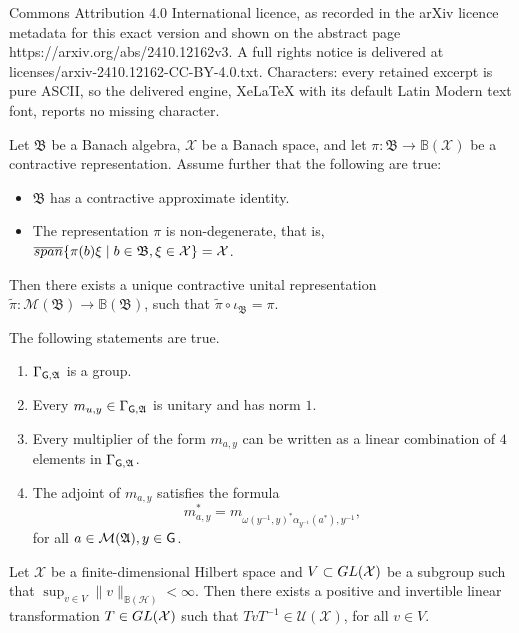 \documentclass[10pt,a4paper]{amsart}
\def\BofH{\mathbb B(\mathcal H)}
\def\G{{\sf G}}
\def\X{\mathcal{X}}
\newcommand{\A}{\mathfrak{A}}
\newcommand{\B}{\mathfrak{B}}
\providecommand{\norm}[1]{\lVert#1\rVert}
\begin{document}
Commons Attribution 4.0 International licence, as recorded in the arXiv licence metadata for this exact version and shown on the abstract page https://arxiv.org/abs/2410.12162v3. A full rights notice is delivered at licenses/arxiv-2410.12162-CC-BY-4.0.txt. Characters: every retained excerpt is pure ASCII, so the delivered engine, XeLaTeX with its default Latin Modern text font, reports no missing character.
\begin{lem}\label{exten}
Let $\B$ be a Banach algebra, $\X$ be a Banach space, and let $\pi:\B\to \mathbb B(\X)$ be a contractive representation. Assume further that the following are true: \begin{itemize}
\item[(i)] $\B$ has a contractive approximate identity.
\item[(ii)] The representation $\pi$ is non-degenerate, that is, $\overline{\rm span}\{\pi(b)\xi\mid b\in\B, \xi\in \X\}=\X$.
\end{itemize}
Then there exists a unique contractive unital representation $\widetilde\pi: \mathcal M(\B)\to \mathbb B(\B)$, such that $\widetilde\pi\circ\iota_\B=\pi$.
\end{lem}

\begin{lem}\label{easy} The following statements are true.
\begin{enumerate}
\item[(i)] $\Gamma_{\G,\A}$ is a group.
\item[(ii)] Every $m_{u,y}\in \Gamma_{\G,\A}$ is unitary and has norm $1$.
\item[(iii)] Every multiplier of the form $m_{a,y}$ can be written as a linear combination of $4$ elements in $\Gamma_{\G,\A}$.
\item[(iv)] The adjoint of $m_{a,y}$ satisfies the formula \begin{equation}\label{inv}
m_{a,y}^{*}=m_{\omega(y^{-1},y)^*\alpha_{y^{-1}}(a^*),y^{-1}},
\end{equation} for all $a\in\mathcal{M}(\A), y\in\G$.
\end{enumerate}
\end{lem}

\begin{lem}\label{dix}
Let $\X$ be a finite-dimensional Hilbert space and $V\subset {\rm GL}(\X)$ be a subgroup such that $\sup_{v\in V}\norm{v}_{\BofH}<\infty$. Then there exists a positive and invertible linear transformation $T\in {\rm GL}(\X)$ such that $TvT^{-1}\in \mathcal U(\X)$, for all $v\in V$.
\end{lem}
\end{document}
